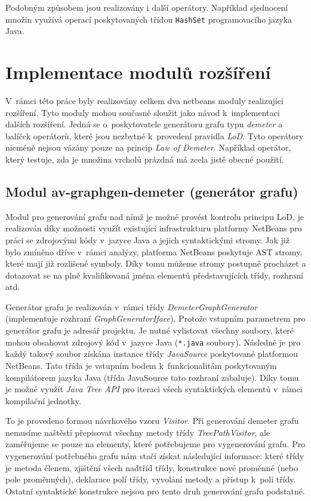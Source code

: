 Podobným způsobem jsou realizovány i další operátory. Například sjednocení množin využívá operací poskytovaných třídou \verb-HashSet- programovacího jazyka Java.

\section{Implementace modulů rozšíření}
V~rámci této práce byly realizovány celkem dva netbeans moduly realizující rozšíření. Tyto moduly mohou současně sloužit jako návod k~implementaci dalších rozšíření. Jedná se o~poskytovatele generátoru grafu typu \emph{demeter} a balíček operátorů, které jsou nezbytné k~provedení pravidla \emph{LoD}. Tyto operátory nicméně nejsou vázány pouze na princip \emph{Law of Demeter}. Například operátor, který testuje, zda je množina vrcholů prázdná má zcela jistě obecné použití.

\subsection{Modul av-graphgen-demeter (generátor grafu)}
Modul pro generování grafu nad nímž je možné provést kontrolu principu LoD, je realizován díky možnosti využít existující infrastrukturu platformy NetBeans pro práci se zdrojovými kódy v~jazyce Java a jejich syntaktickými stromy. Jak již bylo zmíněno dříve v~rámci analýzy, platforma NetBeans poskytuje AST stromy, které mají již rozlišené symboly. Díky tomu můžeme stromy postupně procházet a dotazovat se na plně kvalifikovaná jména elementů představujících třídy, rozhraní atd.

Generátor grafu je realizován v~rámci třídy \emph{DemeterGraphGenerator} (implementuje rozhraní \emph{GraphGeneratorIface}). Protože vstupním parametrem pro generátor grafu je  adresář projektu. Je nutné vylistovat všechny soubory, které mohou obsahovat zdrojový kód v~jazyce Java (\verb+*.java+ soubory). Následně je pro každý takový soubor získána instance třídy \emph{JavaSource} poskytované platformou NetBeans. Tato třída je vstupním bodem k~funkcionalitám poskytovaným kompilátorem jazyka Java (třída JavaSource tato rozhraní zabaluje). Díky tomu je možné využít \emph{Java Tree API} pro iteraci všech syntaktických elementů v~rámci kompilační jednotky.

To je provedeno formou návrhového vzoru \emph{Visitor}. Při generování demeter grafu nemusíme naštěstí přepisovat všechny metody třídy \emph{TreePathVisitor}, ale zaměřujeme se pouze na elementy, které potřebujeme pro vygenerování grafu. Pro vygenerování potřebného grafu nám stačí získat následující informace: které třídy je metoda členem, zjištění všech nadtříd třídy, konstrukce nové proměnné (nebo pole proměnných), deklarace polí třídy, vyvolání metody a přístup k~poli třídy. Ostatní syntaktické konstrukce nejsou pro tento druh generování grafu podstatné.

